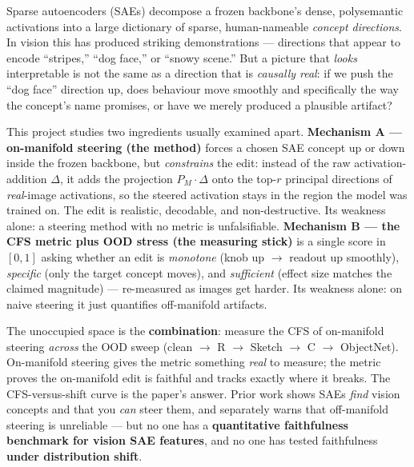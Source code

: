 \documentclass[11pt]{article}
\begin{document}
Sparse autoencoders (SAEs) decompose a frozen backbone's dense, polysemantic
activations into a large dictionary of sparse, human-nameable \emph{concept
directions}. In vision this has produced striking demonstrations --- directions that
appear to encode ``stripes,'' ``dog face,'' or ``snowy scene.'' But a picture that
\emph{looks} interpretable is not the same as a direction that is \emph{causally real}:
if we push the ``dog face'' direction up, does behaviour move smoothly and specifically
the way the concept's name promises, or have we merely produced a plausible artifact?

This project studies two ingredients usually examined apart.
\textbf{Mechanism A --- on-manifold steering (the method)} forces a chosen SAE concept
up or down inside the frozen backbone, but \emph{constrains} the edit: instead of the
raw activation-addition $\Delta$, it adds the projection $P_M\!\cdot\!\Delta$ onto the
top-$r$ principal directions of \emph{real}-image activations, so the steered
activation stays in the region the model was trained on. The edit is realistic,
decodable, and non-destructive. Its weakness alone: a steering method with no metric is
unfalsifiable. \textbf{Mechanism B --- the CFS metric plus OOD stress (the measuring
stick)} is a single score in $[0,1]$ asking whether an edit is \emph{monotone} (knob up
$\rightarrow$ readout up smoothly), \emph{specific} (only the target concept moves), and
\emph{sufficient} (effect size matches the claimed magnitude) --- re-measured as images
get harder. Its weakness alone: on naive steering it just quantifies off-manifold
artifacts.

\begin{insightbox}
The unoccupied space is the \textbf{combination}: measure the CFS of on-manifold
steering \emph{across} the OOD sweep (clean $\rightarrow$ R $\rightarrow$ Sketch
$\rightarrow$ C $\rightarrow$ ObjectNet). On-manifold steering gives the metric
something \emph{real} to measure; the metric proves the on-manifold edit is faithful
and tracks exactly where it breaks. The CFS-versus-shift curve is the paper's answer.
Prior work shows SAEs \emph{find} vision concepts and that you \emph{can} steer them,
and separately warns that off-manifold steering is unreliable --- but no one has a
\textbf{quantitative faithfulness benchmark for vision SAE features}, and no one has
tested faithfulness \textbf{under distribution shift}.
\end{insightbox}
\end{document}
